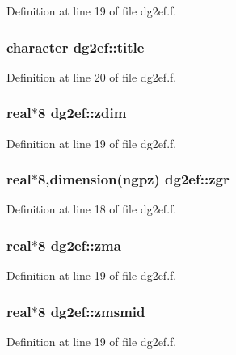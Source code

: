 Definition at line 19 of file dg2ef.f.\hypertarget{namespacedg2ef_b1b73acf07c55965d92e61da63c36537}{
\subsubsection[title]{\setlength{\rightskip}{0pt plus 5cm}character {\bf dg2ef::title}}}
\label{namespacedg2ef_b1b73acf07c55965d92e61da63c36537}




Definition at line 20 of file dg2ef.f.\hypertarget{namespacedg2ef_33d0967f54bd092c5c377101e002674e}{
\subsubsection[zdim]{\setlength{\rightskip}{0pt plus 5cm}real$\ast$8 {\bf dg2ef::zdim}}}
\label{namespacedg2ef_33d0967f54bd092c5c377101e002674e}




Definition at line 19 of file dg2ef.f.\hypertarget{namespacedg2ef_ca7ecaca169a88c163404ba3133ea2dc}{
\subsubsection[zgr]{\setlength{\rightskip}{0pt plus 5cm}real$\ast$8,dimension(ngpz) {\bf dg2ef::zgr}}}
\label{namespacedg2ef_ca7ecaca169a88c163404ba3133ea2dc}




Definition at line 18 of file dg2ef.f.\hypertarget{namespacedg2ef_f8a317fbb724f9325e815fe3eb58c4a1}{
\subsubsection[zma]{\setlength{\rightskip}{0pt plus 5cm}real$\ast$8 {\bf dg2ef::zma}}}
\label{namespacedg2ef_f8a317fbb724f9325e815fe3eb58c4a1}




Definition at line 19 of file dg2ef.f.\hypertarget{namespacedg2ef_b259c4be6a732b880895215ef00f313e}{
\subsubsection[zmsmid]{\setlength{\rightskip}{0pt plus 5cm}real$\ast$8 {\bf dg2ef::zmsmid}}}
\label{namespacedg2ef_b259c4be6a732b880895215ef00f313e}




Definition at line 19 of file dg2ef.f.